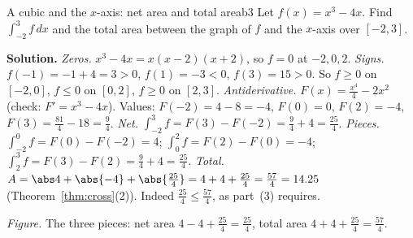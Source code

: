\documentclass[11pt]{article}
\begin{document}
\begin{exmp}{A cubic and the $x$-axis: net area and total area}{b3}
Let $f(x)=x^3-4x$. Find $\int_{-2}^3f\,dx$ and the total area between the graph of $f$ and the $x$-axis over $[-2,3]$.

\textbf{Solution.} \emph{Zeros.} $x^3-4x=x(x-2)(x+2)$, so $f=0$ at $-2,0,2$. \emph{Signs.} $f(-1)=-1+4=3>0$, $f(1)=-3<0$, $f(3)=15>0$. So $f\ge0$ on $[-2,0]$, $f\le0$ on $[0,2]$, $f\ge0$ on $[2,3]$.
\emph{Antiderivative.} $F(x)=\frac{x^4}4-2x^2$ (check: $F'=x^3-4x$). Values: $F(-2)=4-8=-4$, $F(0)=0$, $F(2)=-4$, $F(3)=\frac{81}4-18=\frac94$.
\emph{Net.} $\int_{-2}^3f=F(3)-F(-2)=\frac94+4=\frac{25}4$.
\emph{Pieces.} $\int_{-2}^0f=F(0)-F(-2)=4$; $\int_0^2f=F(2)-F(0)=-4$; $\int_2^3f=F(3)-F(2)=\frac94+4=\frac{25}4$.
\emph{Total.} $A=\abs4+\abs{-4}+\abs{\frac{25}4}=4+4+\frac{25}4=\frac{57}4=14.25$ (Theorem~\ref{thm:cross}(2)). Indeed $\frac{25}4\le\frac{57}4$, as part~(3) requires.

\begin{center}
\par\small\emph{Figure.} The three pieces: net area $4-4+\frac{25}4=\frac{25}4$, total area $4+4+\frac{25}4=\frac{57}4$.
\end{center}
\end{exmp}
\end{document}

